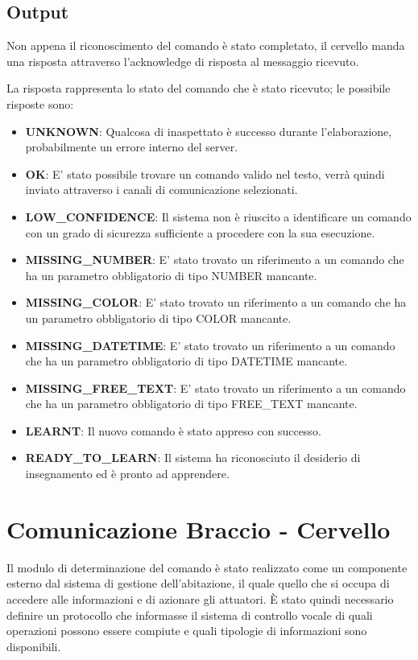 \documentclass[twoside]{supsistudent}
\begin{document}
\section{Output}
Non appena il riconoscimento del comando è stato completato, il cervello manda una risposta attraverso l'acknowledge di risposta al messaggio ricevuto.

La risposta rappresenta lo stato del comando che è stato ricevuto; le possibile risposte sono:
\begin{itemize}
	\item \textbf{UNKNOWN}: Qualcosa di inaspettato è successo durante l'elaborazione, probabilmente un errore interno del server.
	\item \textbf{OK}: E' stato possibile trovare un comando valido nel testo, verrà quindi inviato attraverso i canali di comunicazione selezionati.
	\item \textbf{LOW\_CONFIDENCE}: Il sistema non è riuscito a identificare un comando con un grado di sicurezza sufficiente a procedere con la sua esecuzione.
	\item \textbf{MISSING\_NUMBER}: E' stato trovato un riferimento a un comando che ha un parametro obbligatorio di tipo NUMBER mancante.
	\item \textbf{MISSING\_COLOR}: E' stato trovato un riferimento a un comando che ha un parametro obbligatorio di tipo COLOR mancante.
	\item \textbf{MISSING\_DATETIME}: E' stato trovato un riferimento a un comando che ha un parametro obbligatorio di tipo DATETIME mancante.
	\item \textbf{MISSING\_FREE\_TEXT}: E' stato trovato un riferimento a un comando che ha un parametro obbligatorio di tipo FREE\_TEXT mancante.
	\item \textbf{LEARNT}: Il nuovo comando è stato appreso con successo.
	\item \textbf{READY\_TO\_LEARN}: Il sistema ha riconosciuto il desiderio di insegnamento ed è pronto ad apprendere.
\end{itemize}

\chapter{Comunicazione Braccio - Cervello }
Il modulo di determinazione del comando è stato realizzato come un componente esterno dal sistema di gestione dell'abitazione, il quale quello che si occupa di accedere alle informazioni e di azionare gli attuatori. È stato quindi necessario definire un protocollo che informasse il sistema di controllo vocale di quali operazioni possono essere compiute e quali tipologie di informazioni sono disponibili.
\end{document}

